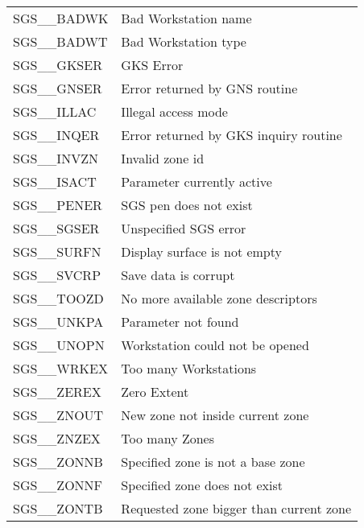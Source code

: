 \begin{tabular}{ll}
SGS\_\_BADWK     & Bad Workstation name \\
SGS\_\_BADWT     & Bad Workstation type \\
SGS\_\_GKSER     & GKS Error \\
SGS\_\_GNSER     & Error returned by GNS routine \\
SGS\_\_ILLAC     & Illegal access mode \\
SGS\_\_INQER     & Error returned by GKS inquiry routine \\
SGS\_\_INVZN     & Invalid zone id \\
SGS\_\_ISACT     & Parameter currently active \\
SGS\_\_PENER     & SGS pen does not exist \\
SGS\_\_SGSER     & Unspecified SGS error \\
SGS\_\_SURFN     & Display surface is not empty \\
SGS\_\_SVCRP     & Save data is corrupt \\
SGS\_\_TOOZD     & No more available zone descriptors \\
SGS\_\_UNKPA     & Parameter not found \\
SGS\_\_UNOPN     & Workstation could not be opened \\
SGS\_\_WRKEX     & Too many Workstations \\
SGS\_\_ZEREX     & Zero Extent \\
SGS\_\_ZNOUT     & New zone not inside current zone \\
SGS\_\_ZNZEX     & Too many Zones \\
SGS\_\_ZONNB     & Specified zone is not a base zone \\
SGS\_\_ZONNF     & Specified zone does not exist \\
SGS\_\_ZONTB     & Requested zone bigger than current zone
\end{tabular}





\newpage
